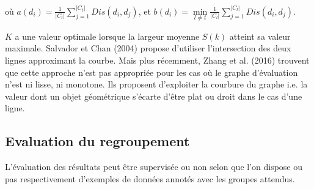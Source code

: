 où $a(d_i) = \frac{1}{\vert C_t \vert} \sum\limits_{j=1}^{\vert C_t \vert} Dis(d_i, d_j)$, et $b(d_i) = \min\limits_{l \neq t} \frac{1}{\vert C_l \vert} \sum\limits_{j=1}^{\vert C_l \vert} Dis(d_i, d_j)$.

$K$ a une valeur optimale lorsque la largeur moyenne $S(k)$ atteint sa valeur maximale. Salvador et Chan (2004) propose d’utiliser l’intersection des deux lignes approximant la courbe. Mais plus récemment, Zhang et al. (2016) trouvent que cette approche n’est pas appropriée pour les cas où le graphe d’évaluation n’est ni lisse, ni monotone. Ils proposent d’exploiter la courbure du graphe i.e. la valeur dont un objet géométrique s'écarte d'être plat ou droit dans le cas d'une ligne.







\subsection{Evaluation du regroupement}
L'évaluation des résultats peut être supervisée ou non selon que l'on dispose ou pas respectivement d'exemples de données annotés avec les groupes attendus.

